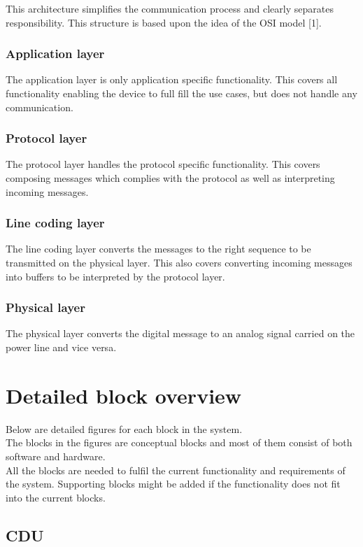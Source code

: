This architecture simplifies the communication process and clearly separates responsibility. This structure is based upon the idea of the OSI model [1].

\subsubsection{Application layer}
The application layer is only application specific functionality. This covers all functionality enabling the device to full fill the use cases, but does not handle any communication.

\subsubsection{Protocol layer}
The protocol layer handles the protocol specific functionality. This covers composing messages which complies with the protocol as well as interpreting incoming messages.

\subsubsection{Line coding layer}
The line coding layer converts the messages to the right sequence to be transmitted on the physical layer. This also covers converting incoming messages into buffers to be interpreted by the protocol layer.

\subsubsection{Physical layer}
The physical layer converts the digital message to an analog signal carried on the power line and vice versa.

\section{Detailed block overview}
Below are detailed figures for each block in the system.\\
The blocks in the figures are conceptual blocks and most of them consist of both software and hardware.\\
All the blocks are needed to fulfil the current functionality and requirements of the system. Supporting blocks might be added if the functionality does not fit into the current blocks.

\subsection{CDU}

